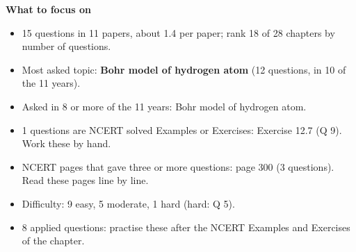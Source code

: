 \begin{minipage}[t]{0.63\linewidth}{\small\textbf{\color{crimson}What to focus on}\par\smallskip
\begin{itemize}[leftmargin=1.1em,itemsep=1pt,topsep=0pt]
\item 15 questions in 11 papers, about 1.4 per paper; rank 18 of 28 chapters by number of questions.
\item Most asked topic: \textbf{Bohr model of hydrogen atom} (12 questions, in 10 of the 11 years).
\item Asked in 8 or more of the 11 years: Bohr model of hydrogen atom.
\item 1 questions are NCERT solved Examples or Exercises: Exercise 12.7 (Q 9). Work these by hand.
\item NCERT pages that gave three or more questions: page 300 (3 questions). Read these pages line by line.
\item Difficulty: 9 easy, 5 moderate, 1 hard (hard: Q 5).
\item 8 applied questions: practise these after the NCERT Examples and Exercises of the chapter.
\end{itemize}}\end{minipage}\par
{}
